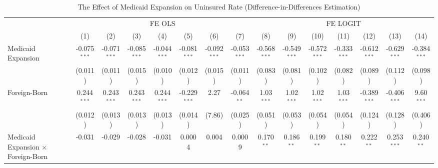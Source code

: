 \documentclass[
]{article}
\begin{document}
\begin{table}[htbp]
   \centering
   \begin{adjustbox}{width = 1.5\textwidth, center}
      \begin{threeparttable}[b]
         \caption{The Effect of Medicaid Expansion on Uninsured Rate (Difference-in-Differences Estimation)}
         \renewcommand*{\arraystretch}{1.5}
         \begin{tabular}{lcccccccccccccc}
            \tabularnewline \midrule \midrule
             & \multicolumn{7}{c}{FE OLS} & \multicolumn{7}{c}{FE LOGIT} \\ \cmidrule(lr){2-8} \cmidrule(lr){9-15}
                                                      & (1)            & (2)            & (3)            & (4)            & (5)            & (6)            & (7)            & (8)            & (9)            & (10)           & (11)           & (12)           & (13)           & (14)\\  
            \midrule 
            Medicaid Expansion                        & -0.075$^{***}$ & -0.071$^{***}$ & -0.085$^{***}$ & -0.044$^{***}$ & -0.081$^{***}$ & -0.092$^{***}$ & -0.053$^{***}$ & -0.568$^{***}$ & -0.549$^{***}$ & -0.572$^{***}$ & -0.333$^{***}$ & -0.612$^{***}$ & -0.629$^{***}$ & -0.384$^{***}$\\   
                                                      & (0.011)        & (0.011)        & (0.015)        & (0.010)        & (0.012)        & (0.015)        & (0.011)        & (0.083)        & (0.081)        & (0.102)        & (0.082)        & (0.089)        & (0.112)        & (0.098)\\   
            Foreign-Born                              & 0.244$^{***}$  & 0.243$^{***}$  & 0.243$^{***}$  & 0.244$^{***}$  & -0.229$^{***}$ & 2.27           & -0.064$^{**}$  & 1.03$^{***}$   & 1.02$^{***}$   & 1.02$^{***}$   & 1.03$^{***}$   & -0.389$^{***}$ & -0.406$^{***}$ & 9.60$^{***}$\\   
                                                      & (0.012)        & (0.013)        & (0.013)        & (0.013)        & (0.014)        & (7.86)         & (0.025)        & (0.051)        & (0.053)        & (0.054)        & (0.054)        & (0.124)        & (0.128)        & (0.406)\\   
            Medicaid Expansion $\times$ Foreign-Born  & -0.031         & -0.029         & -0.028         & -0.031         & 0.0004         & 0.004          & 0.0009         & 0.170$^{**}$   & 0.186$^{**}$   & 0.199$^{**}$   & 0.180$^{**}$   & 0.222$^{**}$   & 0.253$^{***}$  & 0.240$^{**}$\\   

\end{tabular}
\end{threeparttable}
\end{adjustbox}
\end{table}
\end{document}

